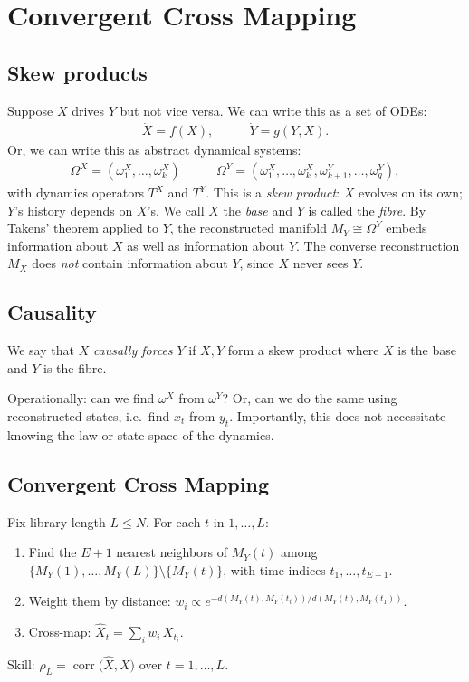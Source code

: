 \chapter{Convergent Cross Mapping}

\section{Skew products}

Suppose $X$ drives $Y$ but not vice versa. We can write this as a set of ODEs:
\begin{align*}
\dot X = f(X), & \qquad \dot Y = g(Y,X).
\end{align*}
Or, we can write this as abstract dynamical systems:
\begin{align*}
  \Omega^{X} = (\omega_1^{X},\dots, \omega_k^{X})& \qquad \Omega^Y = (\omega_1^{X},\dots, \omega_k^{X}, \omega^Y_{k+1}, \dots, \omega^Y_q),
\end{align*}
with dynamics operators $T^X$ and $T^Y$.  This is a \emph{skew
product}: $X$ evolves on its own; $Y$'s history depends on $X$'s. We
call $X$ the \emph{base} and $Y$ is called the \emph{fibre}. By
Takens' theorem applied to $Y$, the reconstructed manifold $M_Y \cong
\Omega^Y$ embeds information about $X$ as well as information about
$Y$. The converse reconstruction $M_X$ does \emph{not} contain
information about $Y$, since $X$ never sees $Y$.

\section{Causality}

\begin{definition}
We say that $X$ \emph{causally forces} $Y$ if $X,Y$ form a skew
product where $X$ is the base and $Y$ is the fibre.
\end{definition}

Operationally: can we find $\omega^X$ from $\omega^Y$? Or, can we do
the same using reconstructed states, i.e.~find $x_t$ from
$y_t$. Importantly, this does not necessitate knowing the law or
state-space of the dynamics.

\section{Convergent Cross Mapping}

Fix library length $L\le N$. For each $t$ in $1,\dots,L$:
\begin{enumerate}[nosep]
\item Find the $E+1$ nearest neighbors of $M_Y(t)$ among
  $\{M_Y(1),\dots,M_Y(L)\}\setminus\{M_Y(t)\}$, with time indices
  $t_1,\dots,t_{E+1}$.
\item Weight them by distance: $w_i \propto
  e^{-d(M_Y(t),M_Y(t_i))/d(M_Y(t),M_Y(t_1))}$.
\item Cross-map: $\hat X_t = \sum_i w_i\, X_{t_i}$.
\end{enumerate}
Skill: $\rho_L = \operatorname{corr}\big(\hat X,X\big)$ over $t=1,\dots,L$.

